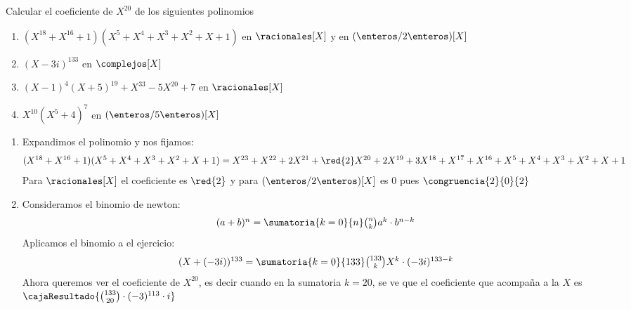 \begin{enunciado}{\ejercicio}
  Calcular el coeficiente de $X^{20}$ de los siguientes polinomios
  \begin{enumerate}[label=\roman*)]
    \item $(X^{18} + X^{16} + 1)(X^5 + X^4 + X^3 + X^2 + X + 1)$ en $\racionales[X]$ y en $(\enteros/2\enteros)[X]$
    \item $(X - 3i)^{133}$ en $\complejos[X]$
    \item $(X - 1)^4(X + 5)^{19} + X^{33} - 5X^{20} + 7$ en $\racionales[X]$
    \item $X^{10}(X^5 + 4)^7$ en $(\enteros/5\enteros)[X]$
  \end{enumerate}
\end{enunciado}

\begin{enumerate}[label=\roman*)]
  \item Expandimos el polinomio y nos fijamos:
        {
        \footnotesize
        $$
          \textstyle
          (X^{18} + X^{16} + 1)(X^5 + X^4 + X^3 + X^2 + X + 1) =
          X^{23} + X^{22} + 2X^{21} + \red{2}X^{20} + 2X^{19} + 3X^{18} + X^{17} + X^{16} + X^5 + X^4 + X^3 + X^2 + X + 1
        $$
        }
        Para $\racionales[X]$ el coeficiente es $\red{2}$ y para $(\enteros/2\enteros)[X]$ es $0$ pues $\congruencia{2}{0}{2}$

  \item Consideramos el binomio de newton:
        $$
          \textstyle
          (a + b)^n = \sumatoria{k=0}{n} \binom{n}{k} a^k \cdot b^{n-k}
        $$
        Aplicamos el binomio a el ejercicio:
        $$
          \textstyle
          (X + (-3i))^{133} = \sumatoria{k=0}{133} \binom{133}{k} X^k \cdot (-3i)^{133 - k}
        $$
        Ahora queremos ver el coeficiente de $X^{20}$, es decir cuando en la sumatoria $k = 20$, se ve que el coeficiente
        que acompaña a la $X$ es
        $\cajaResultado{
            \binom{133}{20} \cdot (-3)^{113} \cdot i
          }$


\end{enumerate}
